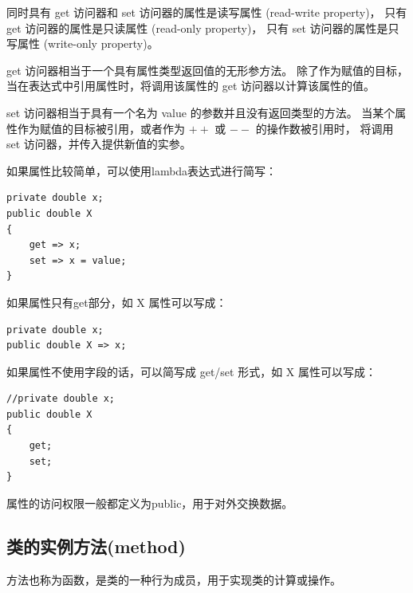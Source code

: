 同时具有 get 访问器和 set 访问器的属性是读写属性 (read-write property)，
只有 get 访问器的属性是只读属性 (read-only property)，
只有 set 访问器的属性是只写属性 (write-only property)。

get 访问器相当于一个具有属性类型返回值的无形参方法。
除了作为赋值的目标，当在表达式中引用属性时，将调用该属性的 get 访问器以计算该属性的值。

set 访问器相当于具有一个名为 value 的参数并且没有返回类型的方法。
当某个属性作为赋值的目标被引用，或者作为 $++$ 或 $--$ 的操作数被引用时，
将调用 set 访问器，并传入提供新值的实参。

如果属性比较简单，可以使用lambda表达式进行简写：
\begin{lstlisting}
private double x;
public double X
{
    get => x;
    set => x = value;
}
\end{lstlisting}

如果属性只有get部分，如 X 属性可以写成：
\begin{lstlisting}
private double x;
public double X => x;
\end{lstlisting}

如果属性不使用字段的话，可以简写成 get/set 形式，如 X 属性可以写成：
\begin{lstlisting}
//private double x;
public double X
{
    get;
    set;
}
\end{lstlisting}

属性的访问权限一般都定义为public，用于对外交换数据。


\subsection{类的实例方法(method)}

方法也称为函数，是类的一种行为成员，用于实现类的计算或操作。

